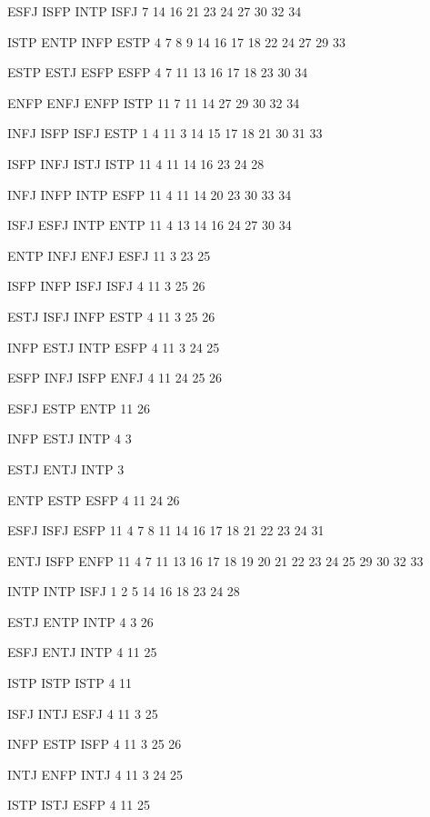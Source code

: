 ESFJ	ISFP	INTP	ISFJ	7	14	16	21	23	24	27	30	32	34																	

ISTP	ENTP	INFP	ESTP	4	7	8	9	14	16	17	18	22	24	27	29	33														

ESTP	ESTJ	ESFP	ESFP	4	7	11	13	16	17	18	23	30	34																	

ENFP	ENFJ	ENFP	ISTP	11	7	11	14	27	29	30	32	34																		

INFJ	ISFP	ISFJ	ESTP	1	4	11	3	14	15	17	18	21	30	31	33															

ISFP	INFJ	ISTJ	ISTP	11	4	11	14	16	23	24	28																			

INFJ	INFP	INTP	ESFP	11	4	11	14	20	23	30	33	34																		

ISFJ	ESFJ	INTP	ENTP	11	4	13	14	16	24	27	30	34																		

ENTP	INFJ	ENFJ	ESFJ	11	3	23	25																							

ISFP	INFP	ISFJ	ISFJ	4	11	3	25	26																						

ESTJ	ISFJ	INFP	ESTP	4	11	3	25	26																						

INFP	ESTJ	INTP	ESFP	4	11	3	24	25																						

ESFP	INFJ	ISFP	ENFJ	4	11	24	25	26																						

ESFJ	ESTP	ENTP	11	26																										

INFP	ESTJ	INTP	4	3																										

ESTJ	ENTJ	INTP	3																											

ENTP	ESTP	ESFP	4	11	24	26																								

ESFJ	ISFJ	ESFP	11	4	7	8	11	14	16	17	18	21	22	23	24	31														

ENTJ	ISFP	ENFP	11	4	7	11	13	16	17	18	19	20	21	22	23	24	25	29	30	32	33									

INTP	INTP	ISFJ	1	2	5	14	16	18	23	24	28																			

ESTJ	ENTP	INTP	4	3	26																									

ESFJ	ENTJ	INTP	4	11	25																									

ISTP	ISTP	ISTP	4	11																										

ISFJ	INTJ	ESFJ	4	11	3	25																								

INFP	ESTP	ISFP	4	11	3	25	26																							

INTJ	ENFP	INTJ	4	11	3	24	25																							

ISTP	ISTJ	ESFP	4	11	25																									

